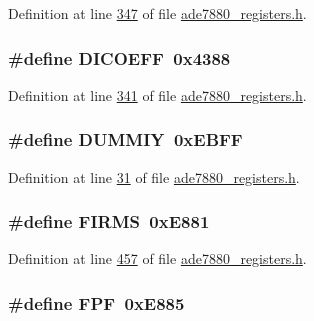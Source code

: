 Definition at line \hyperlink{a00036_source_l00347}{347} of file \hyperlink{a00036_source}{ade7880\-\_\-registers.\-h}.

\hypertarget{a00036_a368be558deaf920bc0805191b5fc737e}{
\subsubsection[{D\-I\-C\-O\-E\-F\-F}]{\setlength{\rightskip}{0pt plus 5cm}\#define D\-I\-C\-O\-E\-F\-F~0x4388}}\label{de/d8c/a00036_a368be558deaf920bc0805191b5fc737e}


Definition at line \hyperlink{a00036_source_l00341}{341} of file \hyperlink{a00036_source}{ade7880\-\_\-registers.\-h}.

\hypertarget{a00036_aa2594962ecec33d43f5b8dea993068ca}{
\subsubsection[{D\-U\-M\-M\-I\-Y}]{\setlength{\rightskip}{0pt plus 5cm}\#define D\-U\-M\-M\-I\-Y~0x\-E\-B\-F\-F}}\label{de/d8c/a00036_aa2594962ecec33d43f5b8dea993068ca}


Definition at line \hyperlink{a00036_source_l00031}{31} of file \hyperlink{a00036_source}{ade7880\-\_\-registers.\-h}.

\hypertarget{a00036_a58ba8cc4291577f8ba6c6fec4408242a}{
\subsubsection[{F\-I\-R\-M\-S}]{\setlength{\rightskip}{0pt plus 5cm}\#define F\-I\-R\-M\-S~0x\-E881}}\label{de/d8c/a00036_a58ba8cc4291577f8ba6c6fec4408242a}


Definition at line \hyperlink{a00036_source_l00457}{457} of file \hyperlink{a00036_source}{ade7880\-\_\-registers.\-h}.

\hypertarget{a00036_a703b4f81abadf5e673e21656cedb1bdc}{
\subsubsection[{F\-P\-F}]{\setlength{\rightskip}{0pt plus 5cm}\#define F\-P\-F~0x\-E885}}\label{de/d8c/a00036_a703b4f81abadf5e673e21656cedb1bdc}


